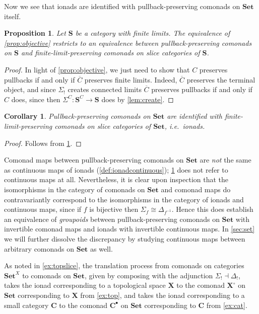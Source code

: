 \documentclass[11pt, oneside, article]{memoir}
\theoremstyle{plain}
\newtheorem{corollary}[theorem]{Corollary}
\newtheorem{proposition}[theorem]{Proposition}
\theoremstyle{definition}
\theoremstyle{remark}
\newenvironment{warning}
{\renewcommand\qedsymbol{$\lrcorner$}%
  \pushQED{\qed}\mywarning}
{\popQED\endmywarning}
\newcommand{\bang}{\mathrm{!}}
\newcommand{\namedcat}[1]{\mathbf{#1}}
\newcommand{\cat}[1]{\mathbf{#1}}
\newcommand{\spa}[1]{\mathbf{#1}}
\newcommand{\Set}{\namedcat{Set}}
\newcommand{\CoalgOn}[2]{{#2}^{#1}}
\newcommand{\CoalgS}[1]{\CoalgOn{#1}{\bS}}
\newcommand{\clift}[1]{\overline{#1}}
\newcommand{\carr}{\Sigma}
\newcommand{\leindex}[1]{\Sigma_{#1}}
\newcommand{\reindex}[1]{\Delta_{#1}}
\newcommand{\slicel}{\Sigma_\bang}
\newcommand{\slicer}{\Delta_\bang}
\newcommand{\car}[1]{\carr^{#1}}
\newcommand{\carC}{\car{\cC}}
\newcommand{\cmnd}[1]{{#1}}
\newcommand{\cC}{\cmnd{C}}
\newcommand{\bC}{\cat{C}}
\newcommand{\bS}{\cat{S}}
\newcommand{\tX}{\spa{X}}
\newcommand{\cX}{\toptocmd{\tX}}
\newcommand{\cbC}{\cattocmd{\bC}}
\newcommand{\CS}{\CoalgS{\cC}}
\newcommand{\cattocmd}[1]{{{#1}^\bullet}}
\newcommand{\toptocmd}[1]{{{#1}^\circ}}
\begin{document}
Now we see that ionads are identified with pullback-preserving
comonads on $\Set$ itself.

\begin{proposition}\label{prop:ionads}
  Let $\bS$ be a category with finite limits. The equivalence of
  \cref{prop:objective} restricts to an equivalence between
  pullback-preserving comonads on $\bS$ and finite-limit-preserving
  comonads on slice categories of $\bS$.
\end{proposition}
\begin{proof}
  In light of \cref{prop:objective}, we just need to show that $\cC$
  preserves pullbacks if and only if $\clift{\cC}$ preserves finite
  limits. Indeed, $\clift{\cC}$ preserves the terminal object, and
  since $\slicel$ creates connected limits $\clift{\cC}$ preserves
  pullbacks if and only if $\cC$ does, since then
  $\carC \colon \CS \to \bS$ does by \cref{lem:create}.
\end{proof}

\begin{corollary}\label{cor:ionads}
  Pullback-preserving comonads on $\Set$ are identified with
  finite-limit-preserving comonads on slice categories of $\Set$,
  i.e.\ ionads.
\end{corollary}

\begin{proof}
  Follows from \cref{prop:ionads}.
\end{proof}

\begin{warning}\label{rem:notcontinuous}
  Comonad maps between pullback-preserving comonads on $\Set$ are
  \emph{not} the same as continuous maps of ionads
  (\cref{def:ionadcontinuous}); \cref{cor:ionads} does not refer to
  continuous maps at all. Nevertheless, it is clear upon inspection
  that the isomorphisms in the category of comonads on $\Set$ and
  comonad maps do contravariantly correspond to the isomorphisms in
  the category of ionads and continuous maps, since if $f$ is
  bijective then $\leindex{f} \cong \reindex{f^{-1}}$. Hence this does
  establish an equivalence of \emph{groupoids} between
  pullback-preserving comonads on $\Set$ with invertible comonad maps
  and ionads with invertible continuous maps.  In \cref{sec:set} we
  will further dissolve the discrepancy by studying continuous maps
  between arbitrary comonads on $\Set$ as well.
\end{warning}

As noted in \cref{ex:topslice}, the translation process from comonads
on categories $\Set^X$ to comonads on $\Set$, given by composing with
the adjunction $\slicel \dashv \slicer$, takes the ionad corresponding
to a topological space $\tX$ to the comonad $\cX$ on $\Set$
corresponding to $\tX$ from \cref{ex:top}, and takes the ionad
corresponding to a small category $\bC$ to the comonad $\cbC$ on
$\Set$ corresponding to $\bC$ from \cref{ex:cat}.
\end{document}
